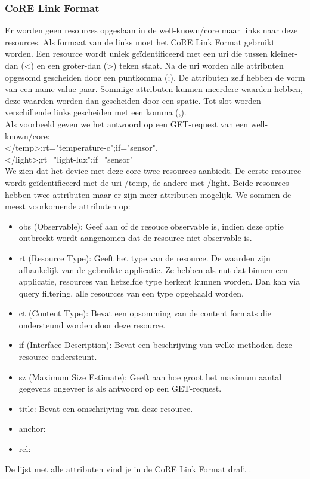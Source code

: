 \subsubsection{CoRE Link Format}
Er worden geen resources opgeslaan in de well-known/core maar links naar deze resources. Als formaat van de links moet het CoRE Link Format gebruikt worden. Een resource wordt uniek ge\"{i}dentificeerd met een uri die tussen kleiner-dan (\textless) en een groter-dan (\textgreater) teken staat. Na de uri worden alle attributen opgesomd gescheiden door een puntkomma (;). De attributen zelf hebben de vorm van een name-value paar. Sommige attributen kunnen meerdere waarden hebben, deze waarden worden dan gescheiden door een spatie. Tot slot worden verschillende links gescheiden met een komma (,).\\

\noindent
Als voorbeeld geven we het antwoord op een GET-request van een well-known/core:\\
\textless/temp\textgreater;rt="temperature-c";if="sensor",\\
\textless/light\textgreater;rt="light-lux";if="sensor"\\
We zien dat het device met deze core twee resources aanbiedt. De eerste resource wordt ge\"{i}dentificeerd met de uri /temp, de andere met /light. Beide resources hebben twee attributen maar er zijn meer attributen mogelijk. We sommen de meest voorkomende attributen op:
\begin{itemize}
\item obs (Observable): Geef aan of de resouce observable is, indien deze optie ontbreekt wordt aangenomen dat de resource niet observable is.
\item rt (Resource Type): Geeft het type van de resource. De waarden zijn afhankelijk van de gebruikte applicatie. Ze hebben als nut dat binnen een applicatie, resources van hetzelfde type herkent kunnen worden. Dan kan via query filtering, alle resources van een type opgehaald worden.
\item ct (Content Type): Bevat een opsomming van de content formats die ondersteund worden door deze resource. 
\item if (Interface Description): Bevat een beschrijving van welke methoden deze resource ondersteunt.
\item sz (Maximum Size Estimate): Geeft aan hoe groot het maximum aantal gegevens ongeveer is als antwoord op een GET-request.
\item title: Bevat een omschrijving van deze resource.
\item anchor: 
\item rel: 
\end{itemize}
De lijst met alle attributen vind je in de CoRE Link Format draft \cite{coapDiscovery}.\\


